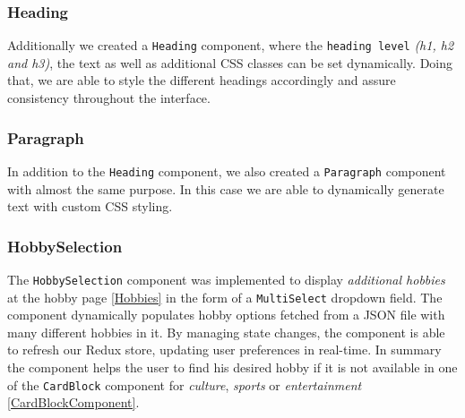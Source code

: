 \documentclass[english,notitlepage,smartquotes]{hgbreport}
\begin{document}
\subsubsection{Heading}
Additionally we created a \texttt{Heading} component, where the \texttt{heading level} \textit{(h1, h2 and h3)}, the text as well as additional CSS classes can be set dynamically. Doing that, we are able to style the different headings accordingly and assure consistency throughout the interface.

\subsubsection{Paragraph}
In addition to the \texttt{Heading} component, we also created a \texttt{Paragraph} component with almost the same purpose. In this case we are able to dynamically generate text with custom CSS styling.

\subsubsection{HobbySelection} \label{HobbySelectionComponent}
The \texttt{HobbySelection} component was implemented to display \textit{additional hobbies} at the hobby page \ref{Hobbies} in the form of a \texttt{MultiSelect} dropdown field. The component dynamically populates hobby options fetched from a JSON file with many different hobbies in it. By managing state changes, the component is able to refresh our Redux store, updating user preferences in real-time. In summary the component helps the user to find his desired hobby if it is not available in one of the \texttt{CardBlock} component for \textit{culture}, \textit{sports} or \textit{entertainment} \ref{CardBlockComponent}.
\end{document}
